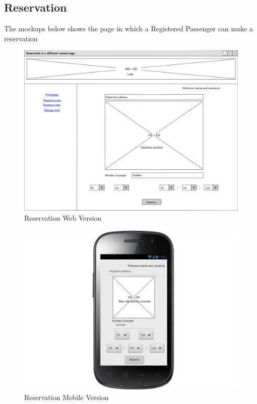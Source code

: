 \subsection{Reservation}
The mockups below shows the page in which a Registered Passenger can make a reservation
\begin{figure}[H]
\centering
\includegraphics[scale=0.35]{mockups/reservation_web.png}
\caption{Reservation Web Version}
\end{figure}
\begin{figure}[H]
\centering
\includegraphics[scale=0.35]{mockups/reservation_mobile.png}
\caption{Reservation Mobile Version}
\end{figure}
\break
